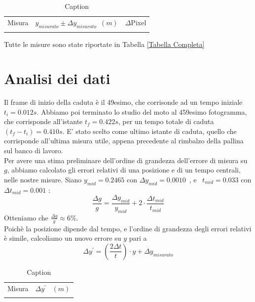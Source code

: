 \documentclass[12pt, a4paper]{article}
\begin{document}
\begin{table}[!h]
    \centering
    \begin{tabular}{|c|c|c|}
    \hline
    \multirow{2}{*}{\small Misura} 
    &\multirow{2}{*}{\small$y_{misurato}\pm\Delta y_{misurato}$\ $(m)$} 
    &\multirow{2}{*}{\small $\Delta$Pixel} 
    \\
    && 
    \\
    \hline
    \hline
       &  & \\
    \hline
    \end{tabular}
        \caption{Caption}
        \label{tab:my_label}
\end{table}

\bigskip
Tutte le misure sono state riportate in Tabella \ref{Tabella Completa}

\section{Analisi dei dati}
Il frame di inizio della caduta è il 49esimo, che corrisonde ad un tempo iniziale \textit{$t_i = 0.012s$}.
Abbiamo poi terminato lo studio del moto al 459esimo fotogramma, che corrisponde all'istante \textit{$t_f = 0.422s$}, per un tempo totale di caduta \textit{$(t_f-t_i) = 0.410s$}. 
E' stato scelto come ultimo istante di caduta, quello che corrisponde all'ultima misura utile, appena precedente al rimbalzo della pallina sul banco di lavoro.\\

Per avere una stima preliminare dell'ordine di grandezza dell'errore di misura su $g$, abbiamo calcolato gli errori relativi di una posizione e di un tempo centrali, nelle nostre misure. Siano $y_{mid}=0.2465$ con $\Delta y_{mid}=0.0010$\ , e \ $t_{mid}=0.033$ con $\Delta t_{mid}=0.001$ :
\begin{equation*}
    \frac{\Delta g}{g}=\frac{\Delta y_{mid}}{y_{mid}}+2\cdot \frac{\Delta t_{mid}}{t_{mid}}
\end{equation*}
Otteniamo che $\displaystyle\frac{\Delta g}{g}\approx 6\%$.\bigskip\\

Poichè la posizione dipende dal tempo, e l'ordine di grandezza degli errori relativi è simile, calcoliamo un nuovo errore su $y$ pari a 
\begin{equation*}
   \Delta y^{'} = \left(\frac{2\Delta t}{t}\right)\cdot y + \Delta y_{misurato}
\end{equation*}

\begin{table}[!h]
    \centering
    \begin{tabular}{|c|c|}
    \hline
    \multirow{2}{*}{\small Misura} 
    &\multirow{2}{*}{$ \Delta y^{'}$ \ $(m)$} 
     
    \\
    & 
    \\
    \hline
    \hline
       &   \\
    \hline
    \end{tabular}
        \caption{Caption}
        \label{tab:my_label}
\end{table}
\end{document}
